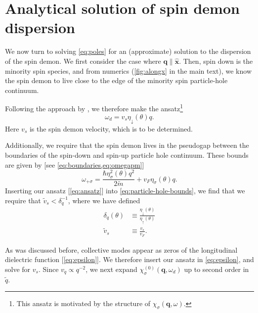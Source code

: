 \documentclass[aps,prb,reprint,twocolumns,superscriptaddress,nofootinbib]{revtex4-2}
\newcommand{\xx}{\hat{\bm{x}}}
\newcommand{\mdos}{\tilde{m}}
\begin{document}
	
	
	\section{Analytical solution of spin demon dispersion}
	We now turn to solving \cref{eq:poles} for an (approximate) solution to the dispersion of the spin demon. 	
	We first consider the case where $\bm q\parallel \xx$. Then, spin down is the minority spin species, and from numerics (\cref{fig:alongx} in the main text), we know the spin demon to live close to the edge of the minority spin particle-hole continuum.
	
	Following the approach by \textcite{santoroAcousticPlasmonsConducting1988}, we therefore make the ansatz\footnote{This ansatz is motivated by the structure of $\chi_\sigma(\bm q,\omega)$.}  
	\begin{equation}
		\omega_d = v_s \eta_{\downarrow}(\theta)q. \label{eq:ansatz}
	\end{equation}
	Here $v_s$ is the spin demon velocity, which is to be determined.
	
	
	Additionally, we require that the spin demon lives in the pseudogap between the boundaries of the spin-down and spin-up particle hole continuum. These bounds are given by [see \cref{eq:boundaries,eq:omegapm}]
	\begin{equation}
		\omega_{+\sigma} = \frac{\hbar\eta_\sigma^2(\theta) q^2}{2\mdos} + v_F  \eta_\sigma(\theta) q. \label{eq:particle-hole-bounds}
	\end{equation}
	Inserting our ansatz [\cref{eq:ansatz}] into \cref{eq:particle-hole-bounds}, we find that we require that $\tilde v_s < \delta_q^{-1}$, where we have defined
	\begin{align}
		\delta_q(\theta)&\equiv \frac{\eta_\downarrow(\theta)}{\eta_\uparrow(\theta)} \\
		\tilde v_s&\equiv  \frac{v_s}{v_F}.
	\end{align}
	
	As was discussed before, collective modes appear as zeros of the longitudinal dielectric function [\cref{eq:epsilon}]. We therefore insert our ansatz in \cref{eq:epsilon}, and solve for $v_s$. Since $v_q\propto q^{-2}$, we next expand  $\chi_\sigma^{(0)}(\bm q,\omega_d)$ up to second order in $\tilde q$.
	
\end{document}
